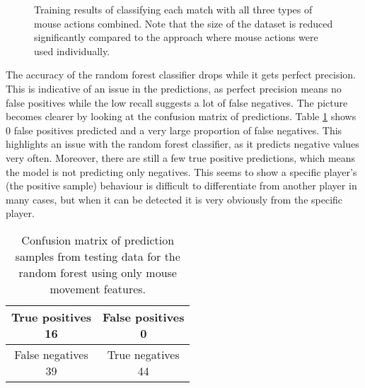 \documentclass[Report.tex]{subfiles}
\newcommand{\newaxis}[7]{
\begin{axis}[
    ybar,
    title={\textbf{#1}},
    ymin=#3, ymax=#4,
    bar width=1em,
    width={#5},
    height={#6},
    legend style={at={#7},anchor=north,legend columns=-1},
    enlarge x limits=0.4,
    x tick label style={align=center,text width=2cm},
    symbolic x coords={Logistic Regression, Random Forest, Multi-layer Perceptron},
    xtick=data,
    ylabel={#2}
]
}
\newcommand{\plotbar}[3] {
\addplot+[
	discard if not={features}{#1},
] table [x=model, y=#2, col sep=comma] {data/15-game-cv.csv};
\addlegendentry{#3}
}
\begin{document}
\begin{figure}[H]
\centering
{}
\caption{Training results of classifying each match with all three types of mouse actions combined. Note that the size of the dataset is reduced significantly compared to the approach where mouse actions were used individually.}
\end{figure}


The accuracy of the random forest classifier drops while it gets perfect precision. This is indicative of an issue in the predictions, as perfect precision means no false positives while the low recall suggests a lot of false negatives. The picture becomes clearer by looking at the confusion matrix of predictions. Table \ref{tbl:rf-mouse-confusion-matrix} shows 0 false positives predicted and a very large proportion of false negatives. This highlights an issue with the random forest classifier, as it predicts negative values very often. Moreover, there are still a few true positive predictions, which means the model is not predicting only negatives. This seems to show a specific player's (the positive sample) behaviour is difficult to differentiate from another player in many cases, but when it can be detected it is very obviously from the specific player. 

\begin{table}[H]
\centering
\begin{tabular}{| c | c |}
\hline
\makecell{True positives \\ 16} & \makecell{False positives \\ 0} \\ \hline
\makecell{False negatives \\ 39} & \makecell{True negatives \\ 44} \\ \hline
\end{tabular}
\caption{Confusion matrix of prediction samples from testing data for the random forest using only mouse movement features.}
\label{tbl:rf-mouse-confusion-matrix}
\end{table}
\end{document}
